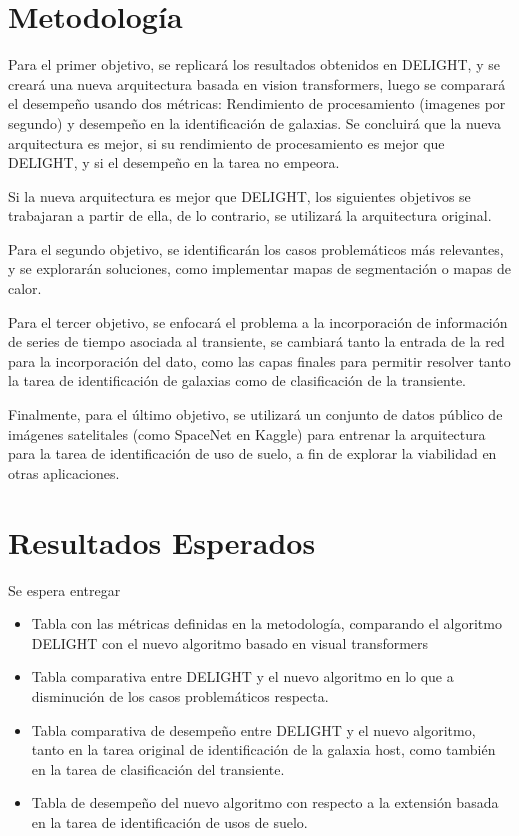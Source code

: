 \documentclass[12pt,a4paper]{article}
\begin{document}
\section{Metodología}
Para el primer objetivo, se replicará los resultados obtenidos en DELIGHT, y se creará una nueva arquitectura basada en vision transformers, luego se comparará el desempeño usando dos métricas: Rendimiento de procesamiento (imagenes por segundo) y desempeño en la identificación de galaxias. Se concluirá que la nueva arquitectura es mejor, si su rendimiento de procesamiento es mejor que DELIGHT, y si el desempeño en la tarea no empeora. \par\null\par

Si la nueva arquitectura es mejor que DELIGHT, los siguientes objetivos se trabajaran a partir de ella, de lo contrario, se utilizará la arquitectura original.

Para el segundo objetivo, se identificarán los casos problemáticos más relevantes, y se explorarán soluciones, como implementar mapas de segmentación o mapas de calor. \par\null\par

Para el tercer objetivo, se enfocará el problema a la incorporación de información de series de tiempo asociada al transiente, se cambiará tanto la entrada de la red para la incorporación del dato, como las capas finales para permitir resolver tanto la tarea de identificación de galaxias como de clasificación de la transiente.  \par\null\par

Finalmente, para el último objetivo, se utilizará un conjunto de datos público de imágenes satelitales (como SpaceNet en Kaggle) para entrenar la arquitectura para la tarea de identificación de uso de suelo, a fin de explorar la viabilidad en otras aplicaciones.
\section{Resultados Esperados}

Se espera entregar
\begin{itemize}
    \item Tabla con las métricas definidas en la metodología, comparando el algoritmo DELIGHT con el nuevo algoritmo basado en visual transformers
    \item Tabla comparativa entre DELIGHT y el nuevo algoritmo en lo que a disminución de los casos problemáticos respecta.
    \item Tabla comparativa de desempeño entre DELIGHT y el nuevo algoritmo, tanto en la tarea original de identificación de la galaxia host, como también en la tarea de clasificación del transiente.
    \item Tabla de desempeño del nuevo algoritmo con respecto a la extensión basada en la tarea de identificación de usos de suelo.
\end{itemize}
\end{document}
